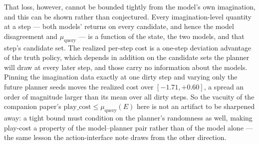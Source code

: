 \documentclass[11pt]{article}
\theoremstyle{remark}
\begin{document}
That loss, however, cannot be bounded tightly from the model's own
imagination, and this can be shown rather than conjectured. Every
imagination-level quantity at a step --- both models' returns on every
candidate, and hence the model disagreement and $\mu_{\mathrm{query}}$
--- is a function of the state, the two models, and that step's
candidate set. The realized per-step cost is a one-step deviation
advantage of the truth policy, which depends in addition on the
candidate sets the planner will draw at every later step, and those
carry no information about the models. Pinning the imagination data
exactly at one dirty step and varying only the future planner seeds
moves the realized cost over $[-1.71, +0.60]$, a spread an order of
magnitude larger than its mean over all dirty steps. So the vacuity of
the companion paper's $\mathrm{play\_cost} \le
\mu_{\mathrm{query}}(E)$ here is not an artifact to be sharpened away:
a tight bound must condition on the planner's randomness as well, making
play-cost a property of the model--planner pair rather than of the model
alone --- the same lesson the action-interface note draws from the other
direction.
\end{document}
